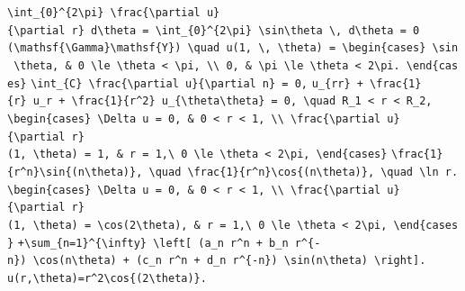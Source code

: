 \documentclass[
  ukrainian,
]{article}
\begin{document}
\texttt{\textbackslash{}int\_\{0\}\^{}\{2\textbackslash{}pi\}\ \textbackslash{}frac\{\textbackslash{}partial\ u\}\{\textbackslash{}partial\ r\}\ d\textbackslash{}theta\ =\ \textbackslash{}int\_\{0\}\^{}\{2\textbackslash{}pi\}\ \textbackslash{}sin\textbackslash{}theta\ \textbackslash{},\ d\textbackslash{}theta\ =\ 0}
\texttt{(\textbackslash{}mathsf\{\textbackslash{}Gamma\}\textbackslash{}mathsf\{Y\})\ \textbackslash{}quad\ u(1,\ \textbackslash{},\ \textbackslash{}theta)\ =\ \textbackslash{}begin\{cases\}\ \textbackslash{}sin\ \textbackslash{}theta,\ \&\ 0\ \textbackslash{}le\ \textbackslash{}theta\ \textless{}\ \textbackslash{}pi,\ \textbackslash{}\textbackslash{}\ 0,\ \&\ \textbackslash{}pi\ \textbackslash{}le\ \textbackslash{}theta\ \textless{}\ 2\textbackslash{}pi.\ \textbackslash{}end\{cases\}}
\texttt{\textbackslash{}int\_\{C\}\ \textbackslash{}frac\{\textbackslash{}partial\ u\}\{\textbackslash{}partial\ n\}\ =\ 0,}
\texttt{u\_\{rr\}\ +\ \textbackslash{}frac\{1\}\{r\}\ u\_r\ +\ \textbackslash{}frac\{1\}\{r\^{}2\}\ u\_\{\textbackslash{}theta\textbackslash{}theta\}\ =\ 0,\ \textbackslash{}quad\ R\_1\ \textless{}\ r\ \textless{}\ R\_2,}
\texttt{\textbackslash{}begin\{cases\}\ \textbackslash{}Delta\ u\ =\ 0,\ \&\ 0\ \textless{}\ r\ \textless{}\ 1,\ \textbackslash{}\textbackslash{}\ \textbackslash{}frac\{\textbackslash{}partial\ u\}\{\textbackslash{}partial\ r\}(1,\ \textbackslash{}theta)\ =\ 1,\ \&\ r\ =\ 1,\textbackslash{}\ 0\ \textbackslash{}le\ \textbackslash{}theta\ \textless{}\ 2\textbackslash{}pi,\ \textbackslash{}end\{cases\}}
\texttt{\textbackslash{}frac\{1\}\{r\^{}n\}\textbackslash{}sin\{(n\textbackslash{}theta)\},\ \textbackslash{}quad\ \textbackslash{}frac\{1\}\{r\^{}n\}\textbackslash{}cos\{(n\textbackslash{}theta)\},\ \textbackslash{}quad\ \textbackslash{}ln\ r.}
\texttt{\textbackslash{}begin\{cases\}\ \textbackslash{}Delta\ u\ =\ 0,\ \&\ 0\ \textless{}\ r\ \textless{}\ 1,\ \textbackslash{}\textbackslash{}\ \textbackslash{}frac\{\textbackslash{}partial\ u\}\{\textbackslash{}partial\ r\}(1,\ \textbackslash{}theta)\ =\ \textbackslash{}cos(2\textbackslash{}theta),\ \&\ r\ =\ 1,\textbackslash{}\ 0\ \textbackslash{}le\ \textbackslash{}theta\ \textless{}\ 2\textbackslash{}pi,\ \textbackslash{}end\{cases\}}
\texttt{+\textbackslash{}sum\_\{n=1\}\^{}\{\textbackslash{}infty\}\ \textbackslash{}left{[}\ (a\_n\ r\^{}n\ +\ b\_n\ r\^{}\{-n\})\ \textbackslash{}cos(n\textbackslash{}theta)\ +\ (c\_n\ r\^{}n\ +\ d\_n\ r\^{}\{-n\})\ \textbackslash{}sin(n\textbackslash{}theta)\ \textbackslash{}right{]}.}
\texttt{u(r,\textbackslash{}theta)=r\^{}2\textbackslash{}cos\{(2\textbackslash{}theta)\}.}
\end{document}
